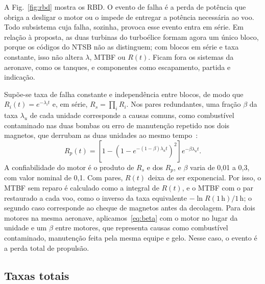 A Fig.~\ref{fig:rbd} mostra os RBD.
O evento de falha é a perda de potência que obriga a desligar o motor ou o impede de entregar a potência necessária ao voo.
Todo subsistema cuja falha, sozinha, provoca esse evento entra em série.
Em relação à proposta, as duas turbinas do turboélice formam agora um único bloco, porque os códigos do NTSB não as distinguem; com blocos em série e taxa constante, isso não altera $\lambda$, MTBF ou $R(t)$.
Ficam fora os sistemas da aeronave, como os tanques, e componentes como escapamento, partida e indicação.

Supõe-se taxa de falha constante e independência entre blocos, de modo que $R_i(t)=e^{-\lambda_i t}$ e, em série, $R_s=\prod_i R_i$.
Nos pares redundantes, uma fração $\beta$ da taxa $\lambda_u$ de cada unidade corresponde a causas comuns, como combustível contaminado nas duas bombas ou erro de manutenção repetido nos dois magnetos, que derrubam as duas unidades ao mesmo tempo~\cite{ebeling1997}:
\begin{equation}
  R_p(t) = \left[1-\left(1-e^{-(1-\beta)\lambda_u t}\right)^2\right] e^{-\beta\lambda_u t}.
  \label{eq:beta}
\end{equation}
A confiabilidade do motor é o produto de $R_s$ e dos $R_p$, e $\beta$ varia de 0,01 a 0,3, com valor nominal de 0,1.
Com pares, $R(t)$ deixa de ser exponencial.
Por isso, o MTBF sem reparo é calculado como a integral de $R(t)$, e o MTBF com o par restaurado a cada voo, como o inverso da taxa equivalente $-\ln R(1\,\mathrm{h})/1\,\mathrm{h}$; o segundo caso corresponde ao cheque de magnetos antes da decolagem.
Para dois motores na mesma aeronave, aplicamos~\eqref{eq:beta} com o motor no lugar da unidade e um $\beta$ entre motores, que representa causas como combustível contaminado, manutenção feita pela mesma equipe e gelo.
Nesse caso, o evento é a perda total de propulsão.

\subsection{Taxas totais}\label{sec:taxas}

